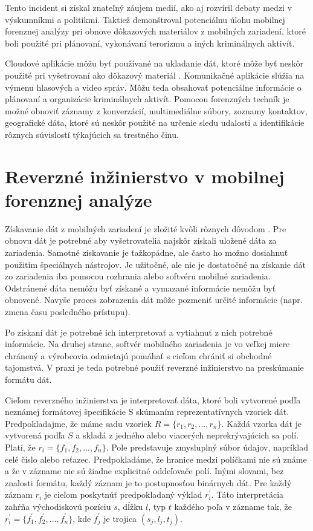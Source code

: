 Tento incident si získal znateľný záujem medií, ako aj rozvíril debaty medzi v výskumníkmi a politikmi. Taktiež demonštroval potenciálnu úlohu mobilnej forenznej analýzy pri obnove dôkazových materiálov z mobilných zariadení, ktoré boli použité pri plánovaní, vykonávaní terorizmu a iných kriminálnych aktivít.

Cloudové aplikácie môžu byť používané na ukladanie dát, ktoré môže byť neskôr použité pri vyšetrovaní ako dôkazový materiál \cite{Cahyani:2016:RMF:3021385.3021421}.
Komunikačné aplikácie slúžia na výmenu hlasových a video správ. Môžu teda obsahovať potenciálne informácie o plánovaní a organizácie kriminálnych aktivít.
Pomocou forenzných techník je možné obnoviť záznamy z konverzácií, multimediálne súbory, zoznamy kontaktov, geografické dáta, ktoré sú neskôr použité na určenie sledu udalosti a identifikácie rôznych súvislostí týkajúcich sa trestného činu.

\chapter{Reverzné inžinierstvo v mobilnej forenznej analýze}

Získavanie dát z mobilných zariadení je zložité kvôli rôznych dôvodom \cite{Wilson:2017:CSM:3077286.3077564}. Pre obnovu dát je potrebné aby vyšetrovatelia najskôr získali uložené dáta za zariadenia. Samotné získavanie je ťažkopádne, ale
často ho možno dosiahnuť použitím špeciálnych nástrojov. Je užitočné, ale nie je dostatočné na získanie dát zo zariadenia iba pomocou rozhrania alebo softvéru mobilné zariadenia. Odstránené dáta nemôžu byť získané a vymazané informácie nemôžu byť obnovené. Navyše proces zobrazenia dát môže pozmeniť určité informácie (napr. zmena času posledného prístupu).

Po získaní dát je potrebné ich interpretovať a vytiahnuť z nich potrebné informácie.
Na druhej strane, softvér mobilného zariadenia je vo veľkej miere chránený a výrobcovia odmietajú pomáhať s cieľom chrániť si obchodné tajomstvá. V praxi je teda potrebné použiť reverzné inžinierstvo na preskúmanie formátu dát.

Cieľom reverzného inžinierstva je interpretovať dáta, ktoré boli vytvorené podľa neznámej formátovej špecifikácie S skúmaním reprezentatívnych vzoriek dát. Predpokladajme, že máme sadu vzoriek $R = \{r_{1}, r_{2}, ..., r_{n}\}$. Každá vzorka dát je vytvorená podľa $S$ a skladá z jedného alebo viacerých neprekrývajúcich sa polí. Platí, že $r_{i} = \{f_{1}, f_{2}, ..., f_{n}\}$. Pole predstavuje zmysluplný súbor údajov, napríklad celé číslo alebo reťazec. Predpokladáme, že hranice medzi políčkami nie sú známe a že v zázname nie sú žiadne explicitné oddeľovače polí. Inými slovami, bez znalosti formátu, každý záznam je to postupnosťou binárnych dát. Pre každý záznam $r_{i}$ je cieľom poskytnúť predpokladaný výklad $r^{'}_{i}$. Táto interpretácia zahŕňa východiskovú pozíciu $s$, dĺžku $l$, typ $t$ každého poľa v zázname tak, že $r^{'}_{i} = \{f^{'}_{1}, f^{'}_{2}, ..., f^{'}_{n}\}$, kde $f^{'}_{j}$ je trojica $(s_{j}, l_{j}, t_{j})$.

